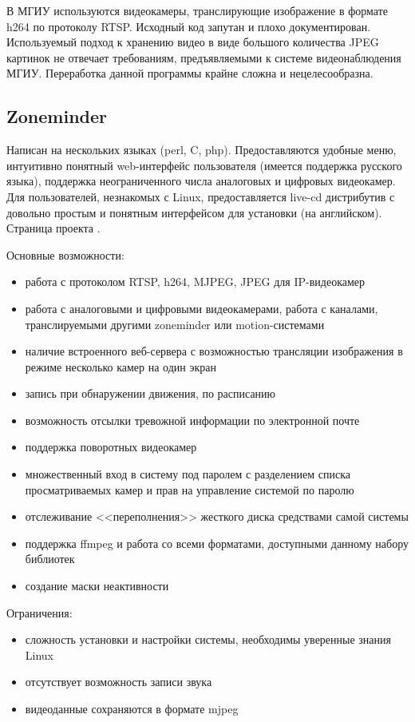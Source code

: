 В МГИУ используются видеокамеры, транслирующие изображение в формате h264 по протоколу RTSP.
Исходный код запутан и плохо документирован.
Используемый подход к хранению видео в виде большого количества JPEG картинок не
отвечает требованиям, предъявляемыми к системе видеонаблюдения МГИУ.
Переработка данной программы крайне сложна и нецелесообразна.

\subsection{Zoneminder}

Написан на нескольких языках (perl, C, php).
Предоставляются удобные меню, интуитивно понятный web-интерфейс пользователя
(имеется поддержка русского языка), поддержка неограниченного числа аналоговых
и цифровых видеокамер. Для пользователей, незнакомых с Linux, предоставляется live-cd
дистрибутив с довольно простым и понятным интерфейсом для установки (на английском).
Страница проекта \cite{zoneminder_about}.

\medskip

Основные возможности:
\smallskip
\begin{itemize}
	\item
	работа с протоколом RTSP, h264, MJPEG, JPEG для IP-видеокамер
	\item
	работа с аналоговыми и цифровыми видеокамерами, работа с каналами,
	транслируемыми другими zoneminder или motion-системами
	\item
	наличие встроенного веб-сервера с возможностью трансляции изображения
	в режиме несколько камер на один экран
	\item
	запись при обнаружении движения, по расписанию
	\item
	возможность отсылки тревожной информации по электронной почте
	\item
	поддержка поворотных видеокамер
	\item
	множественный вход в систему под паролем с разделением списка просматриваемых камер
	и прав на управление системой по паролю
	\item
	отслеживание <<переполнения>> жесткого диска средствами самой системы
	\item
	поддержка ffmpeg и работа со всеми форматами, доступными данному набору библиотек
	\item
	создание маски неактивности
\end{itemize}

\medskip

Ограничения:
\smallskip
\begin{itemize}
	\item сложность установки и настройки системы, необходимы уверенные знания Linux
	\item отсутствует возможность записи звука
	\item видеоданные сохраняются в формате mjpeg
\end{itemize}


